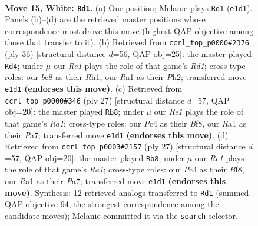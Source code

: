 \documentclass[11pt]{article}
\begin{document}
\clearpage

\begin{figure}[p]\centering
\begin{subfigure}{0.46\textwidth}\centering
\resizebox{\linewidth}{!}{%
\newchessgame
\chessboard[
  setfen={rnbr2k1/pp6/6p1/2p2p1p/2P5/2P5/P3BPPP/R1B1R1K1 w - - 0 15},
  showmover=false,
  pgfstyle=straightmove, color=movearrow, markmove={e1-d1}
]}
\caption{}
\end{subfigure}\hfill
\begin{subfigure}{0.46\textwidth}\centering
\resizebox{\linewidth}{!}{%
\newchessgame
\chessboard[
  setfen={5b1r/1p2pk1p/p2p4/2r5/4pP2/8/PPP3PP/1K1R1B1R w - - 0 19},
  showmover=false,
  pgfstyle=straightmove, color=movearrow, markmove={d1-d4}
]}
\caption{}
\end{subfigure}
\\[4pt]
\begin{subfigure}{0.46\textwidth}\centering
\resizebox{\linewidth}{!}{%
\newchessgame
\chessboard[
  setfen={r3kb1r/p1pn1ppp/2p5/8/2p5/4P1P1/PP1BKP1P/RNR5 b kq - 3 14},
  showmover=false,
  pgfstyle=straightmove, color=movearrow, markmove={a8-b8}
]}
\caption{}
\end{subfigure}\hfill
\begin{subfigure}{0.46\textwidth}\centering
\resizebox{\linewidth}{!}{%
\newchessgame
\chessboard[
  setfen={r3kb1r/p1pn1ppp/2p5/8/2p5/4P1P1/PP1BKP1P/RNR5 b kq - 3 14},
  showmover=false,
  pgfstyle=straightmove, color=movearrow, markmove={a8-b8}
]}
\caption{}
\end{subfigure}
\caption{\textbf{Move 15, White: \texttt{Rd1}.} (a) Our position; Melanie plays \texttt{Rd1} (\texttt{e1d1}). Panels (b)--(d) are the retrieved master positions whose correspondence most drove this move (highest QAP objective among those that transfer to it). (b) Retrieved from \texttt{ccrl\_top\_p0000\#2376} (ply 36) [structural distance $d$=56, QAP obj=25]: the master played \texttt{Rd4}; under $\mu$ our \emph{Re1} plays the role of that game's \emph{Rd1}; cross-type roles: our \emph{b}c8 as their \emph{R}h1, our \emph{R}a1 as their \emph{P}h2; transferred move \texttt{e1d1} \textbf{(endorses this move)}. (c) Retrieved from \texttt{ccrl\_top\_p0000\#346} (ply 27) [structural distance $d$=57, QAP obj=20]: the master played \texttt{Rb8}; under $\mu$ our \emph{Re1} plays the role of that game's \emph{Ra1}; cross-type roles: our \emph{P}c4 as their \emph{B}f8, our \emph{R}a1 as their \emph{P}a7; transferred move \texttt{e1d1} \textbf{(endorses this move)}. (d) Retrieved from \texttt{ccrl\_top\_p0003\#2157} (ply 27) [structural distance $d$=57, QAP obj=20]: the master played \texttt{Rb8}; under $\mu$ our \emph{Re1} plays the role of that game's \emph{Ra1}; cross-type roles: our \emph{P}c4 as their \emph{B}f8, our \emph{R}a1 as their \emph{P}a7; transferred move \texttt{e1d1} \textbf{(endorses this move)}. Synthesis: 12 retrieved analogs transferred to \texttt{Rd1} (summed QAP objective 94, the strongest correspondence among the candidate moves); Melanie committed it via the \texttt{search} selector.}
\label{fig:thought-m28}
\end{figure}
\end{document}
